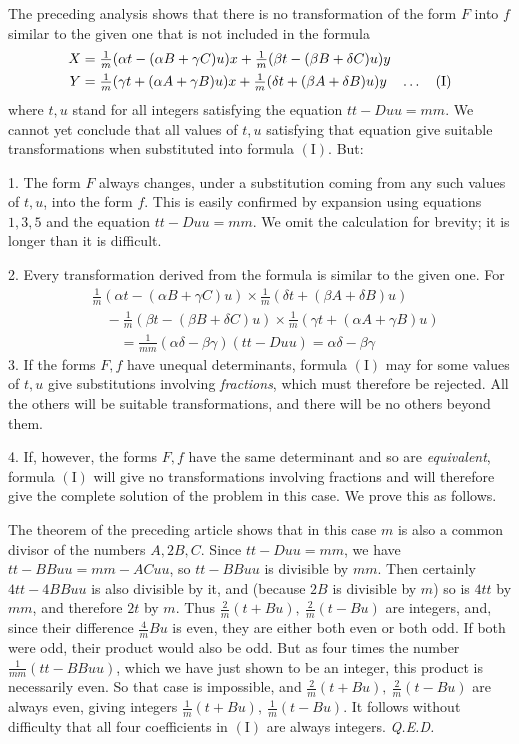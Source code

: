 The preceding analysis shows that there is no transformation of the form $F$ into $f$ similar to the given one that is not included in the formula
\[
\begin{aligned}
X&=\tfrac{1}{m}(\alpha t-(\alpha B+\gamma C)u)x+\tfrac{1}{m}(\beta t-(\beta B+\delta C)u)y\\
Y&=\tfrac{1}{m}(\gamma t+(\alpha A+\gamma B)u)x+\tfrac{1}{m}(\delta t+(\beta A+\delta B)u)y\quad\mathinner{.\,.\,.}\quad(\mathrm{I})
\end{aligned}
\]
where $t,u$ stand for all integers satisfying the equation $tt-Duu=mm$. We cannot yet conclude that all values of $t,u$ satisfying that equation give suitable transformations when substituted into formula $(\mathrm{I})$. But:

1. The form $F$ always changes, under a substitution coming from any such values of $t,u$, into the form $f$. This is easily confirmed by expansion using equations $1,3,5$ and the equation $tt-Duu=mm$. We omit the calculation for brevity; it is longer than it is difficult.

2. Every transformation derived from the formula is similar to the given one. For
\[
\begin{aligned}
&\tfrac{1}{m}(\alpha t-(\alpha B+\gamma C)u)\times\tfrac{1}{m}(\delta t+(\beta A+\delta B)u)\\
&\quad-\tfrac{1}{m}(\beta t-(\beta B+\delta C)u)\times\tfrac{1}{m}(\gamma t+(\alpha A+\gamma B)u)\\
&\qquad=\tfrac{1}{mm}(\alpha\delta-\beta\gamma)(tt-Duu)=\alpha\delta-\beta\gamma
\end{aligned}
\]
3. If the forms $F,f$ have unequal determinants, formula $(\mathrm{I})$ may for some values of $t,u$ give substitutions involving \textit{fractions}, which must therefore be rejected. All the others will be suitable transformations, and there will be no others beyond them.

4. If, however, the forms $F,f$ have the same determinant and so are \textit{equivalent}, formula $(\mathrm{I})$ will give no transformations involving fractions
and will therefore give the complete solution of the problem in this case. We prove this as follows.

The theorem of the preceding article shows that in this case $m$ is also a common divisor of the numbers $A,2B,C$. Since $tt-Duu=mm$, we have $tt-BBuu=mm-ACuu$, so $tt-BBuu$ is divisible by $mm$. Then certainly $4tt-4BBuu$ is also divisible by it, and (because $2B$ is divisible by $m$) so is $4tt$ by $mm$, and therefore $2t$ by $m$. Thus $\frac{2}{m}(t+Bu),\ \frac{2}{m}(t-Bu)$ are integers, and, since their difference $\frac{4}{m}Bu$ is even, they are either both even or both odd. If both were odd, their product would also be odd. But as four times the number $\frac{1}{mm}(tt-BBuu)$, which we have just shown to be an integer, this product is necessarily even. So that case is impossible, and $\frac{2}{m}(t+Bu),\ \frac{2}{m}(t-Bu)$ are always even, giving integers $\frac{1}{m}(t+Bu),\ \frac{1}{m}(t-Bu)$. It follows without difficulty that all four coefficients in $(\mathrm{I})$ are always integers. \mbox{\textit{Q.E.D.}}


